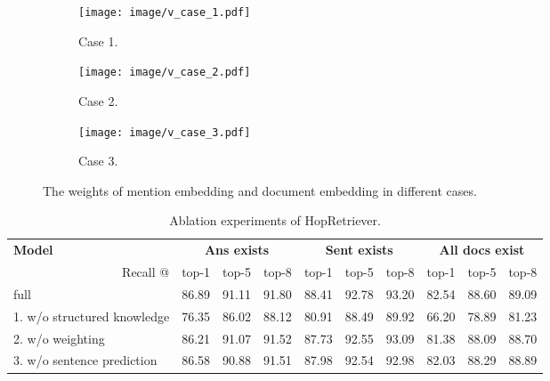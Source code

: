 \documentclass[letterpaper]{article} \usepackage{aaai21}  \usepackage{times}  \usepackage{helvet} \usepackage{courier}  \usepackage[hyphens]{url}  \usepackage{graphicx} \urlstyle{rm} \def\UrlFont{\rm}  \usepackage{graphicx}  \usepackage{natbib}  \usepackage{caption} \frenchspacing  \setlength{\pdfpagewidth}{8.5in}  \setlength{\pdfpageheight}{11in}
\begin{document}
\begin{figure*}[h]
    \centering
    \begin{subfigure}[b]{0.3\textwidth}
        \centering
        \texttt{[image: image/v\_case\_1.pdf]}
        \caption{Case 1.}
        \label{fig:case_1}
    \end{subfigure}
    \begin{subfigure}[b]{0.3\textwidth}
        \centering
        \texttt{[image: image/v\_case\_2.pdf]}
        \caption{Case 2.}
        \label{fig:case_2}
    \end{subfigure}
    \begin{subfigure}[b]{0.3\textwidth}
        \centering
        \texttt{[image: image/v\_case\_3.pdf]}
        \caption{Case 3.}
        \label{fig:case_3}
    \end{subfigure}

\caption {The weights of mention embedding and document embedding in different cases.}
\label{fig:cases}    
\end{figure*}

\begin{table*}[ht]
    \footnotesize
    \centering
    \begin{tabular}{l|ccc|ccc|ccc}
        \hline
        \multicolumn{1}{l|}{\textbf{Model}}         & \multicolumn{3}{c|}{\textbf{Ans exists}} & \multicolumn{3}{c|}{\textbf{Sent exists}} & \multicolumn{3}{c}{\textbf{All docs exist}}   \\ 
        \multicolumn{1}{r|}{Recall @}               & top-1        & top-5       & top-8       & top-1        & top-5       & top-8       & top-1        & top-5       & top-8              \\ \hline
        full                                        & 86.89        & 91.11       & 91.80       & 88.41        & 92.78       & 93.20       & 82.54        & 88.60       & 89.09              \\ \hline
        1. w/o structured knowledge                 & 76.35        & 86.02       & 88.12       & 80.91        & 88.49       & 89.92       & 66.20        & 78.89       & 81.23              \\
        2. w/o weighting                            & 86.21        & 91.07       & 91.52       & 87.73        & 92.55       & 93.09       & 81.38        & 88.09       & 88.70              \\
        3. w/o sentence prediction                  & 86.58        & 90.88       & 91.51       & 87.98        & 92.54       & 92.98       & 82.03        & 88.29       & 88.89               \\
        \hline
    \end{tabular}
    \caption{Ablation experiments of HopRetriever.}
    \label{tab:abl_res}
\end{table*}
\end{document}
